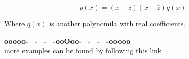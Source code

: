 \documentclass{ximera}
\begin{document}
\[ p(x) = (x-z) (x-\bar{z}) q(x)    \]

Where $q(x)$ is another polynomila with real coefficients.










\begin{center}
\textbf{\textcolor{green!50!black}{ooooo-=-=-=-ooOoo-=-=-=-ooooo}} \\

more examples can be found by following this link\\ 

\end{center}
\end{document}
